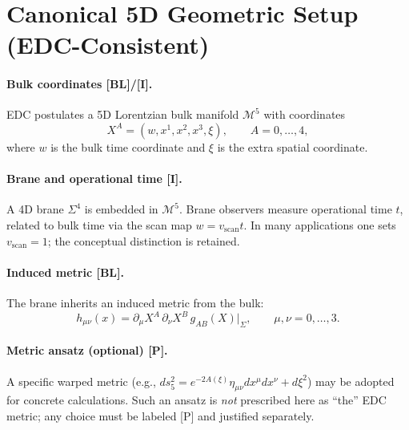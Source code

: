 \documentclass[11pt,a4paper]{article}
\newcommand{\tagBL}{\textcolor{blue!70!black}{[BL]}}
\newcommand{\tagI}{\textcolor{green!50!black}{[I]}}
\newcommand{\tagP}{\textcolor{orange!80!black}{[P]}}
\begin{document}
\section{Canonical 5D Geometric Setup (EDC-Consistent)}
\label{sec:geometry}

\paragraph{Bulk coordinates \tagBL{}/\tagI{}.}
EDC postulates a 5D Lorentzian bulk manifold $\mathcal{M}^5$ with coordinates
\begin{equation}
    X^A = (w, x^1, x^2, x^3, \xi), \qquad A = 0, \ldots, 4,
\end{equation}
where $w$ is the bulk time coordinate and $\xi$ is the extra spatial coordinate.

\paragraph{Brane and operational time \tagI{}.}
A 4D brane $\Sigma^4$ is embedded in $\mathcal{M}^5$.
Brane observers measure operational time $t$, related to bulk time via the scan map $w = v_{\mathrm{scan}} t$.
In many applications one sets $v_{\mathrm{scan}} = 1$; the conceptual distinction is retained.

\paragraph{Induced metric \tagBL{}.}
The brane inherits an induced metric from the bulk:
\begin{equation}
    h_{\mu\nu}(x) = \partial_\mu X^A \, \partial_\nu X^B \, g_{AB}(X)\big|_{\Sigma}, \qquad \mu, \nu = 0, \ldots, 3.
\end{equation}

\paragraph{Metric ansatz (optional) \tagP{}.}
A specific warped metric (e.g., $ds^2_5 = e^{-2A(\xi)} \eta_{\mu\nu} dx^\mu dx^\nu + d\xi^2$) may be adopted for concrete calculations.
Such an ansatz is \emph{not} prescribed here as ``the'' EDC metric; any choice must be labeled \tagP{} and justified separately.

\end{document}
